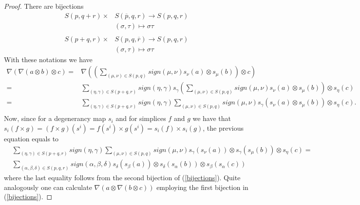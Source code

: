 \documentclass[TFM.tex]{subfiles}
\begin{document}
\begin{proof}
There are bijections
\begin{equation}\label{bijections}
\begin{aligned}
S(p,q+r)\times &S(\overline{p},q,r)\longrightarrow S(p,q,r)\\
&(\sigma,\tau)\longmapsto \sigma\tau\\
\\
S(p+q,r)\times &S(p,q,\overline{r})\longrightarrow S(p,q,r)\\
&(\sigma,\tau)\longmapsto \sigma\tau
\end{aligned}
\end{equation}
With these notations we have
\begin{align*}
\nabla(\nabla(a\otimes b)\otimes c)=&\nabla\left(\left(\sum_{(\mu,\nu)\in S(p,q)} sign(\mu,\nu) s_\nu(a) \otimes s_\mu(b)\right)\otimes c\right)\\
=& \sum_{(\eta,\gamma)\in S(p+q,r)}sign(\eta,\gamma)s_\gamma\left(\sum_{(\mu,\nu)\in S(p,q)} sign(\mu,\nu) s_\nu(a) \otimes s_\mu(b)\right)\otimes s_\eta(c)\\
=&\sum_{(\eta,\gamma)\in S(p+q,r)}sign(\eta,\gamma)\sum_{(\mu,\nu)\in S(p,q)} sign(\mu,\nu) s_\gamma(s_\nu(a) \otimes s_\mu(b))\otimes s_\eta(c).\\
\end{align*}
Now, since for a degenerancy map $s_i$ and for simplices $f$ and $g$ we have that $s_i(f\times g)=(f\times g)(s^i)=f(s^i)\times g(s^i)=s_i(f)\times s_i(g)$, the previous equation equals to
\begin{align*}
&\sum_{(\eta,\gamma)\in S(p+q,r)}sign(\eta,\gamma)\sum_{(\mu,\nu)\in S(p,q)} sign(\mu,\nu) s_\gamma(s_\nu(a)) \otimes s_\gamma(s_\mu(b))\otimes s_\eta(c)=\\
&\sum_{(\alpha,\beta,\delta)\in S(p,q,r)}sign(\alpha,\beta,\delta)s_\delta(s_\beta(a))\otimes s_\delta(s_\alpha(b))\otimes s_\beta(s_\alpha(c))
\end{align*}
where the last equality follows from the second bijection of (\ref{bijections}). Quite analogously one can calculate $\nabla(a\otimes\nabla(b\otimes c))$ employing the first bijection in (\ref{bijections}).
\end{proof}

\end{document}
